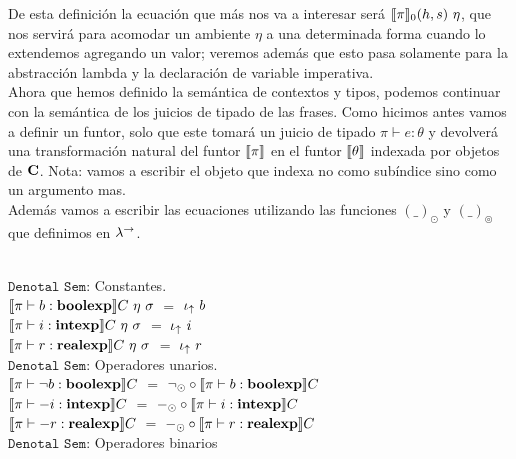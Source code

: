 De esta definici\'on la ecuaci\'on que m\'as nos va a interesar ser\'a $\llbracket \pi \rrbracket_0(h,s) \ \eta$,
que nos servir\'a para acomodar un ambiente $\eta$ a una determinada forma cuando lo extendemos
agregando un valor; veremos adem\'as que esto pasa solamente para la abstracci\'on lambda y
la declaraci\'on de variable imperativa.\\

Ahora que hemos definido la sem\'antica de contextos y tipos, podemos continuar con
la sem\'antica de los juicios de tipado de las frases. Como hicimos antes vamos a definir un 
funtor, solo que este tomar\'a un juicio de tipado $\pi \vdash e : \theta$ y 
devolver\'a una transformaci\'on natural del funtor $\llbracket \pi \rrbracket$ en el funtor $\llbracket \theta \rrbracket$ 
indexada por objetos de $\textbf{C}$. Nota: vamos a escribir el objeto que indexa no como
sub\'indice sino como un argumento mas.\\

Adem\'as vamos a escribir las ecuaciones utilizando las funciones $(\_)_{\odot}$ y
$(\_)_{\circledcirc}$ que definimos en $\lambda^{\rightarrow}$.\\
\

\noindent
$\texttt{Denotal Sem:}$ Constantes.\\

$\llbracket  \pi \vdash b : \textbf{boolexp}  \rrbracket C \ \eta \ \sigma$ $=$ $\iota_{\uparrow} \ b$\\

$\llbracket  \pi \vdash i : \textbf{intexp}   \rrbracket C \ \eta \ \sigma$ $=$ $\iota_{\uparrow} \ i$\\

$\llbracket  \pi \vdash r : \textbf{realexp}  \rrbracket C \ \eta \ \sigma$ $=$ $\iota_{\uparrow} \ r$\\

\noindent
$\texttt{Denotal Sem:}$ Operadores unarios.\\

$\llbracket  \pi \vdash \neg b : \textbf{boolexp}  \rrbracket C$ 
$=$ 
$\neg_{\odot} \circ \llbracket \pi \vdash b : \textbf{boolexp} \rrbracket C$\\

$\llbracket  \pi \vdash -i : \textbf{intexp}  \rrbracket C$ 
$=$ 
$-_{\odot} \circ \llbracket \pi \vdash i : \textbf{intexp} \rrbracket C$\\

$\llbracket  \pi \vdash -r : \textbf{realexp}  \rrbracket C$ 
$=$ 
$-_{\odot} \circ \llbracket \pi \vdash r : \textbf{realexp} \rrbracket C$\\

\noindent
$\texttt{Denotal Sem:}$ Operadores binarios\\


